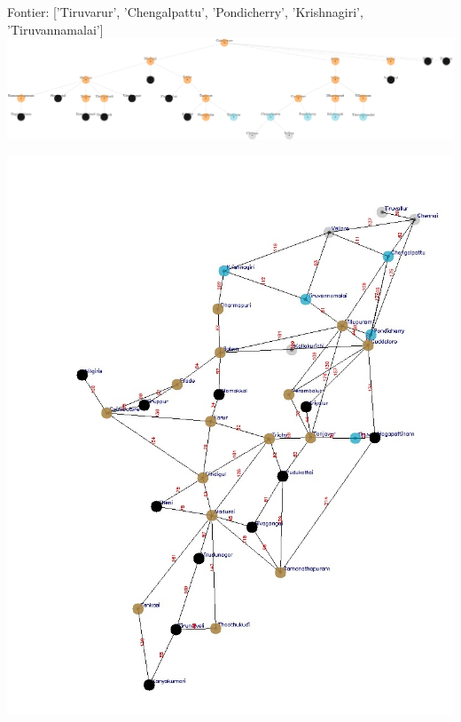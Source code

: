 \documentclass[xcolor=table]{beamer}
\begin{document}
\begin{frame}
  { \tiny Fontier: ['Tiruvarur', 'Chengalpattu', 'Pondicherry', 'Krishnagiri', 'Tiruvannamalai']}
  \includegraphics[width=1\textwidth]{../BFSNodes/39-1.png}
  \begin{center}
    \includegraphics[height=0.6\textheight]{../BFSoutput/tamilBFS37.jpg}
  \end{center}
\end{frame}
\end{document}
